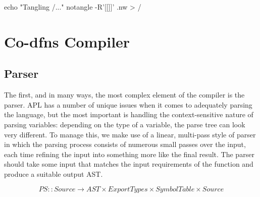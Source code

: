\documentclass{article}%
\begin{document}
\nwenddocs{}\plusendmoddef\nwstartdeflinemarkup{}\nwenddeflinemarkup
echo "Tangling /..."
notangle -R'[[]]' .nw > /
\eatline
{}\nwendcode{}\nwdocspar
\section{Co-dfns Compiler}

\subsection{Parser}

The first, and in many ways, the most complex element of the 
compiler is the parser.
APL has a number of unique issues when it comes to adequately 
parsing the language,
but the most important is handling the context-sensitive 
nature of parsing variables: depending on the type of a variable,
the parse tree can look very different.
To manage this, we make use of a linear, multi-pass style of 
parser in which the parsing process consists of numerous small 
passes over the input, each time refining the input into something
more like the final result.
The parser should take some input that matches the input requirements
of the {\Tt{}\nwendquote} function and produce a suitable output AST.

$$PS :: Source → AST × ExportTypes × SymbolTable × Source$$
\end{document}
